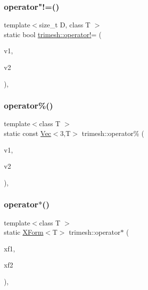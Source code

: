 \subsubsection{\texorpdfstring{operator"!=()}{operator!=()}\hspace{0.1cm}{\footnotesize\ttfamily [3/3]}}
{\footnotesize\ttfamily template$<$size\+\_\+t D, class T $>$ \\
static bool \hyperlink{namespacetrimesh_af767195cb37f08a930059365eb736329}{trimesh\+::operator!}= (\begin{DoxyParamCaption}\item[{const \hyperlink{classtrimesh_1_1Vec}{Vec}$<$ D, T $>$ \&}]{v1,  }\item[{const \hyperlink{classtrimesh_1_1Vec}{Vec}$<$ D, T $>$ \&}]{v2 }\end{DoxyParamCaption})\hspace{0.3cm}{\ttfamily [inline]}, {\ttfamily [static]}}

\mbox{\label{namespacetrimesh_ab15dfdb74d75baef2c04d9d6db29c974}} 
\subsubsection{\texorpdfstring{operator\%()}{operator\%()}}
{\footnotesize\ttfamily template$<$class T $>$ \\
static const \hyperlink{classtrimesh_1_1Vec}{Vec}$<$3,T$>$ trimesh\+::operator\% (\begin{DoxyParamCaption}\item[{const \hyperlink{classtrimesh_1_1Vec}{Vec}$<$ 3, T $>$ \&}]{v1,  }\item[{const \hyperlink{classtrimesh_1_1Vec}{Vec}$<$ 3, T $>$ \&}]{v2 }\end{DoxyParamCaption})\hspace{0.3cm}{\ttfamily [inline]}, {\ttfamily [static]}}

\mbox{\label{namespacetrimesh_afb8f7c3cf819ec607d468466aecc306c}} 
\subsubsection{\texorpdfstring{operator$\ast$()}{operator*()}\hspace{0.1cm}{\footnotesize\ttfamily [1/3]}}
{\footnotesize\ttfamily template$<$class T $>$ \\
static \hyperlink{classtrimesh_1_1XForm}{X\+Form}$<$T$>$ trimesh\+::operator$\ast$ (\begin{DoxyParamCaption}\item[{const \hyperlink{classtrimesh_1_1XForm}{X\+Form}$<$ T $>$ \&}]{xf1,  }\item[{const \hyperlink{classtrimesh_1_1XForm}{X\+Form}$<$ T $>$ \&}]{xf2 }\end{DoxyParamCaption})\hspace{0.3cm}{\ttfamily [inline]}, {\ttfamily [static]}}

